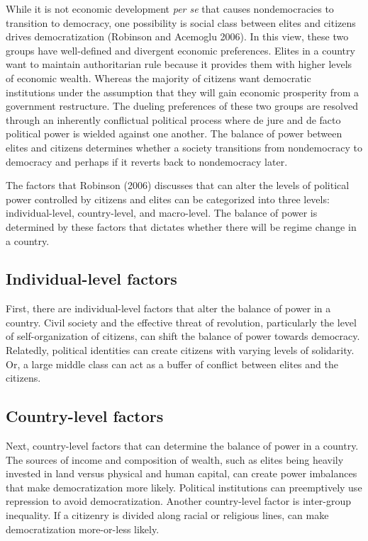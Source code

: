 \documentclass[12pt,]{article}
\begin{document}
While it is not economic development \emph{per se} that causes
nondemocracies to transition to democracy, one possibility is social
class between elites and citizens drives democratization (Robinson and
Acemoglu 2006). In this view, these two groups have well-defined and
divergent economic preferences. Elites in a country want to maintain
authoritarian rule because it provides them with higher levels of
economic wealth. Whereas the majority of citizens want democratic
institutions under the assumption that they will gain economic
prosperity from a government restructure. The dueling preferences of
these two groups are resolved through an inherently conflictual
political process where de jure and de facto political power is wielded
against one another. The balance of power between elites and citizens
determines whether a society transitions from nondemocracy to democracy
and perhaps if it reverts back to nondemocracy later.

The factors that Robinson (2006) discusses that can alter the levels of
political power controlled by citizens and elites can be categorized
into three levels: individual-level, country-level, and macro-level. The
balance of power is determined by these factors that dictates whether
there will be regime change in a country.

\hypertarget{individual-level-factors}{%
\subsection{Individual-level factors}\label{individual-level-factors}}

First, there are individual-level factors that alter the balance of
power in a country. Civil society and the effective threat of
revolution, particularly the level of self-organization of citizens, can
shift the balance of power towards democracy. Relatedly, political
identities can create citizens with varying levels of solidarity. Or, a
large middle class can act as a buffer of conflict between elites and
the citizens.

\hypertarget{country-level-factors}{%
\subsection{Country-level factors}\label{country-level-factors}}

Next, country-level factors that can determine the balance of power in a
country. The sources of income and composition of wealth, such as elites
being heavily invested in land versus physical and human capital, can
create power imbalances that make democratization more likely. Political
institutions can preemptively use repression to avoid democratization.
Another country-level factor is inter-group inequality. If a citizenry
is divided along racial or religious lines, can make democratization
more-or-less likely.
\end{document}
